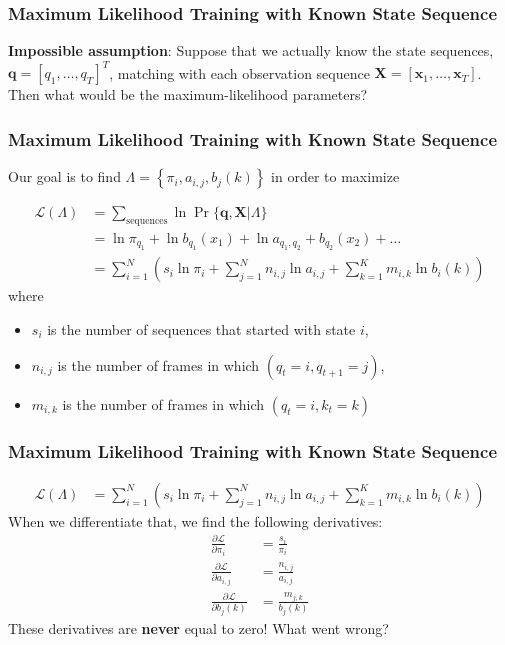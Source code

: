 \documentclass{beamer}
\begin{document}
\begin{frame}
  \frametitle{Maximum Likelihood Training with Known State Sequence}

  {\bf Impossible assumption}: Suppose that we actually know the state
  sequences, $\mathbf{q}=[q_1,\ldots,q_T]^T$, matching with each
  observation sequence $\mathbf{X}=[\mathbf{x}_1,\ldots,\mathbf{x}_T]$.  Then
  what would be the maximum-likelihood parameters?

\end{frame}

\begin{frame}
  \frametitle{Maximum Likelihood Training with Known State Sequence}

  Our goal is to find $\Lambda=\left\{\pi_i,a_{i,j},b_j(k)\right\}$ in
  order to maximize

  \begin{align*}
    {\mathcal L}(\Lambda) &= \sum_{\text{sequences}}\ln \Pr\{\mathbf{q},\mathbf{X}|\Lambda\}\\
    &= \ln \pi_{q_1} + \ln b_{q_1}(x_1) + \ln a_{q_1,q_2} + b_{q_2}(x_2) + \ldots\\
    &= \sum_{i=1}^N\left(s_i\ln\pi_{i}+\sum_{j=1}^N n_{i,j}\ln a_{i,j} + \sum_{k=1}^Km_{i,k}\ln b_i(k)\right)
  \end{align*}
  where
  \begin{itemize}
  \item $s_i$ is the number of sequences that started with state $i$,
  \item $n_{i,j}$ is the number of frames in which $(q_{t}=i,q_{t+1}=j)$,
  \item $m_{i,k}$ is the number of frames in which $(q_t=i,k_t=k)$
  \end{itemize}
\end{frame}

\begin{frame}
  \frametitle{Maximum Likelihood Training with Known State Sequence}

  \begin{align*}
    {\mathcal L}(\Lambda) 
    &= \sum_{i=1}^N\left(s_i\ln\pi_{i}+\sum_{j=1}^N n_{i,j}\ln a_{i,j}+\sum_{k=1}^Km_{i,k}\ln b_i(k)\right)
  \end{align*}
  When we differentiate that, we find the following derivatives:
  \begin{align*}
    \frac{\partial\mathcal L}{\partial \pi_i} &= \frac{s_i}{\pi_i}\\
    \frac{\partial\mathcal L}{\partial a_{i,j}} &= \frac{n_{i,j}}{a_{i,j}}\\
    \frac{\partial\mathcal L}{\partial b_j(k)} &= \frac{m_{j,k}}{b_{j}(k)}
  \end{align*}
  These derivatives are {\bf never} equal to zero!  What went wrong?
\end{frame}
\end{document}

